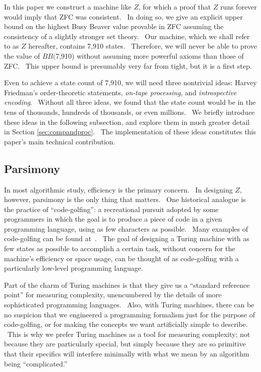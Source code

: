 \documentclass[11pt]{article}
\newcommand{\statenum}{7,910 }
\newcommand{\statenumcomma}{7,910, }
\newcommand{\bbstatenum}{$BB($7,910) }
\begin{document}
In this paper we construct a machine like $Z$, for which a proof that $Z$ runs forever would imply that ZFC was consistent. \ In doing so, we give an explicit upper bound on the highest Busy Beaver value provable in ZFC assuming the consistency of a slightly stronger set theory. \ Our machine, which we shall refer to as $Z$ hereafter, contains \statenum states. \ Therefore, we will never be able to prove the value of \bbstatenum without assuming more powerful axioms than those of ZFC. \ This upper bound is presumably very far from tight, but it is a first step.

Even to achieve a state count of \statenumcomma we will need three nontrivial ideas: Harvey Friedman's order-theoretic statements, \emph{on-tape processing}, and \emph{introspective encoding}. \ Without all three ideas, we found that the state count would be in the tens of thousands, hundreds of thousands, or even millions. \ We briefly introduce these ideas in the following subsection, and explore them in much greater detail in Section \ref{sec:compandproc}. \ The implementation of these ideas constitutes this paper's main technical contribution.

\subsection{Parsimony}

In most algorithmic study, efficiency is the primary concern. \ In designing $Z$, however, parsimony is the only thing that matters. \ One historical analogue is the practice of ``code-golfing'': a recreational pursuit adopted by some programmers in which the goal is to produce a piece of code in a given programming language, using as few characters as possible. \ Many examples of code-golfing can be found at~\cite{codegolf}. \ The goal of designing a Turing machine with as few states as possible to accomplish a certain task, without concern for the machine's efficiency or space usage, can be thought of as code-golfing with a particularly low-level programming language.

Part of the charm of Turing machines is that they give us a ``standard reference point'' for measuring complexity, unencumbered by the details of more sophisticated programming languages. \ Also, with Turing machines, there can be no suspicion that we engineered a programming formalism just for the purpose of code-golfing, or for making the concepts we want artificially simple to describe. \ This is why we prefer Turing machines as a tool for measuring complexity; not because they are particularly special, but simply because they are so primitive that their specifics will interfere minimally with what we mean by an algorithm being ``complicated.''
\end{document}
